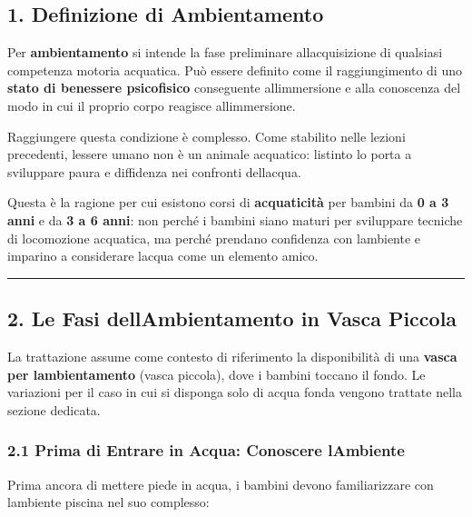 \documentclass[a4paper,11pt]{article}
\begin{document}
\subsection{1. Definizione di
      Ambientamento}\label{definizione-di-ambientamento}

Per \textbf{ambientamento} si intende la fase preliminare
all\textquotesingle acquisizione di qualsiasi competenza motoria
acquatica. Può essere definito come il raggiungimento di uno
\textbf{stato di benessere psicofisico} conseguente
all\textquotesingle immersione e alla conoscenza del modo in cui il
proprio corpo reagisce all\textquotesingle immersione.

Raggiungere questa condizione è complesso. Come stabilito nelle lezioni
precedenti, l\textquotesingle essere umano non è un animale acquatico:
l\textquotesingle istinto lo porta a sviluppare paura e diffidenza nei
confronti dell\textquotesingle acqua.

Questa è la ragione per cui esistono corsi di \textbf{acquaticità} per
bambini da \textbf{0 a 3 anni} e da \textbf{3 a 6 anni}: non perché i
bambini siano maturi per sviluppare tecniche di locomozione acquatica,
ma perché prendano confidenza con l\textquotesingle ambiente e imparino
a considerare l\textquotesingle acqua come un elemento amico.

\begin{center}\rule{0.5\linewidth}{0.5pt}\end{center}

\subsection{2. Le Fasi dell\textquotesingle Ambientamento in Vasca
      Piccola}\label{le-fasi-dellambientamento-in-vasca-piccola}

La trattazione assume come contesto di riferimento la disponibilità di
una \textbf{vasca per l\textquotesingle ambientamento} (vasca piccola),
dove i bambini toccano il fondo. Le variazioni per il caso in cui si
disponga solo di acqua fonda vengono trattate nella sezione dedicata.

\subsubsection{2.1 Prima di Entrare in Acqua: Conoscere
      l\textquotesingle Ambiente}\label{prima-di-entrare-in-acqua-conoscere-lambiente}

Prima ancora di mettere piede in acqua, i bambini devono familiarizzare
con l\textquotesingle ambiente piscina nel suo complesso:
\end{document}
